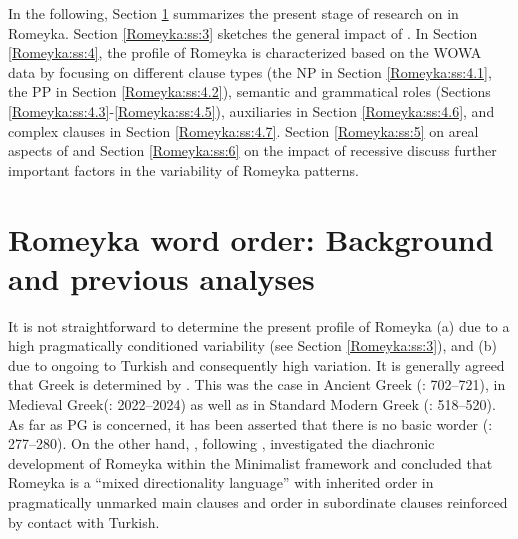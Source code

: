 \documentclass[output=paper,colorlinks,citecolor=brown]{langscibook}
\begin{document}
In the following, Section \ref{Romeyka:ss:2} summarizes the present stage of research on  in Romeyka. Section \ref{Romeyka:ss:3} sketches the general impact of . In Section \ref{Romeyka:ss:4}, the  profile of Romeyka is characterized based on the WOWA data by focusing on different clause types (the NP in Section \ref{Romeyka:ss:4.1}, the PP in Section \ref{Romeyka:ss:4.2}), semantic and grammatical roles (Sections \ref{Romeyka:ss:4.3}-\ref{Romeyka:ss:4.5}), auxiliaries in Section \ref{Romeyka:ss:4.6}, and complex clauses in Section \ref{Romeyka:ss:4.7}. Section \ref{Romeyka:ss:5} on areal aspects of  and Section \ref{Romeyka:ss:6} on the impact of recessive  discuss further important factors in the variability of Romeyka  patterns.

\section{Romeyka word order: Background and previous analyses}\label{Romeyka:ss:2}

It is not straightforward to determine the present  profile of Romeyka 
(a) due to a high pragmatically conditioned variability (see Section \ref{Romeyka:ss:3}), and
(b) due to ongoing  to Turkish and consequently high variation. 
It is generally agreed that Greek  is determined by . This was the case in Ancient Greek (\citealt{vanemdeboas2019}: 702--721), in Medieval Greek\footnotemark (\citealt{holtonetal2019}: 2022--2024) as well as in Standard Modern Greek (\citealt{holtonetal2012}: 518--520). As far as PG is concerned, it has been asserted that there is no basic worder (\citealt{drettasPontic1997}: 277--280). On the other hand, \citet{neocleousEvolution2022,neocleous_word_2020}, following \citet{sitaridouReframing2016}, investigated the diachronic development of Romeyka  within the Minimalist framework and concluded that Romeyka is a ``mixed directionality language'' \citep{neocleousNever2022} with inherited  order in pragmatically unmarked main clauses and  order in subordinate clauses reinforced by contact with Turkish. 
\end{document}
